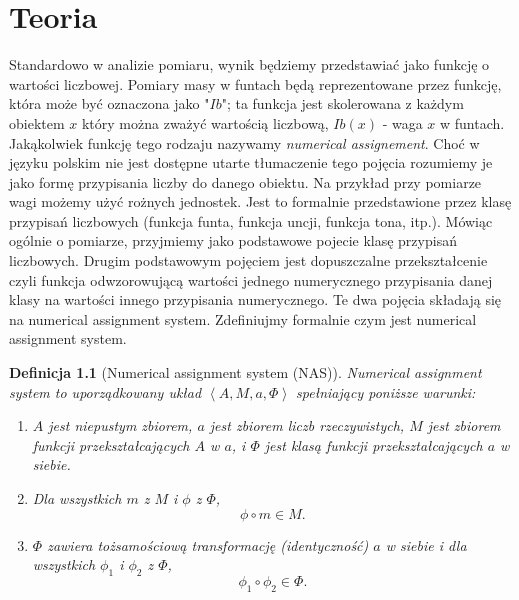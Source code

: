 \documentclass[12pt,a4paper]{report}
\newtheorem{definition}{Definicja}
\newcommand{\tuple}[1]{\left\langle {#1} \right\rangle}
\begin{document}
\chapter{Teoria}

Standardowo w analizie pomiaru, wynik będziemy przedstawiać jako funkcję o wartości liczbowej. Pomiary masy w funtach będą reprezentowane przez funkcję, która może być oznaczona jako "$Ib$";  ta funkcja jest skolerowana z każdym obiektem $x$ który można zważyć wartością liczbową, $Ib(x)$ - waga $x$ w funtach. Jakąkolwiek funkcję tego rodzaju nazywamy \textit{numerical assignement}. Choć w języku polskim nie jest dostępne utarte tłumaczenie tego pojęcia rozumiemy je jako formę przypisania liczby do danego obiektu. Na przykład przy pomiarze wagi możemy użyć rożnych jednostek. Jest to formalnie przedstawione  przez klasę przypisań liczbowych (funkcja funta, funkcja uncji, funkcja tona, itp.). Mówiąc ogólnie o pomiarze, przyjmiemy jako podstawowe pojecie klasę przypisań liczbowych. Drugim podstawowym pojęciem jest dopuszczalne przekształcenie czyli funkcja odwzorowującą wartości jednego numerycznego przypisania danej klasy na wartości innego przypisania numerycznego. Te dwa pojęcia składają się na numerical assignment system. Zdefiniujmy formalnie czym jest numerical assignment system.
\begin{definition}[Numerical assignment system (NAS)]
Numerical assignment system to uporządkowany układ $\tuple{A, M, a, \Phi}$ spełniający poniższe warunki:
\begin{enumerate}
\item
$A$ jest niepustym zbiorem, $a$ jest zbiorem liczb rzeczywistych, $M$ jest zbiorem funkcji przekształcających $A$ w $a$, i $\Phi$ jest klasą funkcji przekształcających $a$ w siebie.  
\item
Dla wszystkich $m$ z $M$ i $\phi$ z $\Phi$, 
$$
\phi \circ m \in M.
$$ 
\item
$\Phi$ zawiera tożsamościową transformację (identyczność) $a$ w siebie i dla wszystkich $\phi_{1}$ i $\phi_{2}$ z $\Phi$, 
$$
\phi_{1} \circ \phi_{2} \in \Phi.
$$

\end{enumerate}

\end{definition}
\end{document}

